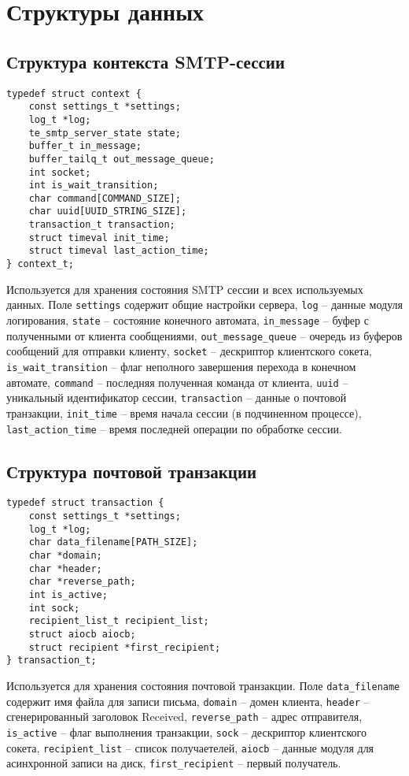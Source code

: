\section{Структуры данных}

\subsection{Структура контекста SMTP-сессии}

\begin{verbatim}
typedef struct context {
    const settings_t *settings;
    log_t *log;
    te_smtp_server_state state;
    buffer_t in_message;
    buffer_tailq_t out_message_queue;
    int socket;
    int is_wait_transition;
    char command[COMMAND_SIZE];
    char uuid[UUID_STRING_SIZE];
    transaction_t transaction;
    struct timeval init_time;
    struct timeval last_action_time;
} context_t;
\end{verbatim}

Используется для хранения состояния SMTP сессии и всех используемых данных.
Поле \verb;settings; содержит общие настройки сервера,
\verb;log; -- данные модуля логирования,
\verb;state; -- состояние конечного автомата,
\verb;in_message; -- буфер с полученными от клиента сообщениями,
\verb;out_message_queue; -- очередь из буферов сообщений для отправки клиенту,
\verb;socket; -- дескриптор клиентского сокета,
\verb;is_wait_transition; -- флаг неполного завершения перехода в конечном автомате,
\verb;command; -- последняя полученная команда от клиента,
\verb;uuid; -- уникальный идентификатор сессии,
\verb;transaction; -- данные о почтовой транзакции,
\verb;init_time; -- время начала сессии (в подчиненном процессе),
\verb;last_action_time; -- время последней операции по обработке сессии.

\subsection{Структура почтовой транзакции}

\begin{verbatim}
typedef struct transaction {
    const settings_t *settings;
    log_t *log;
    char data_filename[PATH_SIZE];
    char *domain;
    char *header;
    char *reverse_path;
    int is_active;
    int sock;
    recipient_list_t recipient_list;
    struct aiocb aiocb;
    struct recipient *first_recipient;
} transaction_t;
\end{verbatim}

Используется для хранения состояния почтовой транзакции.
Поле \verb;data_filename; содержит имя файла для записи письма,
\verb;domain; -- домен клиента,
\verb;header; -- сгенерированный заголовок Received,
\verb;reverse_path; -- адрес отправителя,
\verb;is_active; -- флаг выполнения транзакции,
\verb;sock; -- дескриптор клиентского сокета,
\verb;recipient_list; -- список получаетелей,
\verb;aiocb; -- данные модуля для асинхронной записи на диск,
\verb;first_recipient; -- первый получатель.

